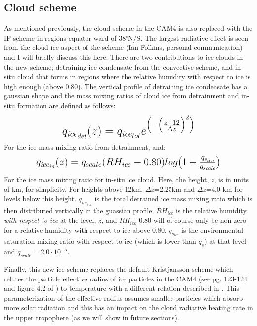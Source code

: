 \documentclass[letterpaper,12pt,titlepage,oneside,final]{book}
\begin{document}
\subsection{Cloud scheme}
As mentioned previously, the cloud scheme in the CAM4 is also replaced with the IF scheme in regions equator-ward of 38$^{\circ}$N/S. The largest radiative effect is seen from the cloud ice aspect of the scheme (Ian Folkins, personal communication) and I will briefly discuss this here. There are two contributions to ice clouds in the new scheme; detraining ice condensate from the convective scheme, and in-situ cloud that forms in regions where the relative humidity with respect to ice is high enough (above 0.80). The vertical profile of detraining ice condensate has a gaussian shape and the mass mixing ratios of cloud ice from detrainment and in-situ formation are defined as follows:
\begin{align}
\mbox{\fontsize{17.28}{21.6}\selectfont\(
q_{ice_{det}}(z)=q_{ice_{tot}}e^{\big(-\big(\frac{z-12}{\Delta{z}}\big)^{2}\big)}
\)}
\end{align}
For the ice mass mixing ratio from detrainment, and:
\begin{align}
\mbox{\fontsize{15}{21.6}\selectfont\(
q_{ice_{in}}(z)=q_{scale}(RH_{ice}-0.80)log\big(1+\frac{q_{s_{ice}}}{q_{scale}}\big)
\)}
\end{align}
For the ice mass mixing ratio for in-situ ice cloud. Here, the  height, $z$, is in units of km, for simplicity. For heights above 12km, $\Delta{z}$=2.25km and $\Delta{z}$=4.0 km for levels below this height. $q_{ice_{tot}}$ is the total detrained ice mass mixing ratio which is then distributed vertically in the guassian profile. $RH_{ice}$ is the relative humidity \textit{with respect to ice} at the level, $z$, and $RH_{ice}$-0.80 will of course only be non-zero for a relative humidity with respect to ice above 0.80. $q_{s_{ice}}$ is the environmental saturation mixing ratio with respect to ice (which is lower than $q_{s}$) at that level and $q_{scale}=2.0\cdot10^{-5}$. 

Finally, this new ice scheme replaces the default Kristjansson scheme which relates the particle effective radius of ice particles \citep{kristjansson_impact_2000} in the CAM4 (see pg. 123-124 and figure 4.2 of \cite{neale_description_2010}) to temperature with a different relation described in \citep{garrett_small_2003}. This parameterization of the effective radius assumes smaller particles which absorb more solar radiation and this has an impact on the cloud radiative heating rate in the upper tropophere (as we will show in future sections). 
\end{document}
